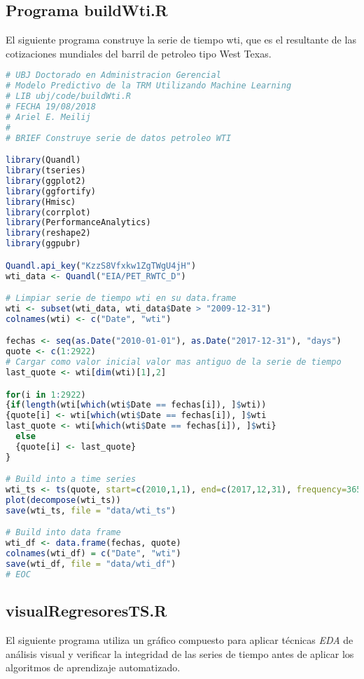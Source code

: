 \subsection{Programa buildWti.R}
El siguiente programa construye la serie de tiempo wti, que es el resultante de las cotizaciones mundiales del barril de petroleo tipo West Texas.
\begin{lstlisting}[language=R]
# UBJ Doctorado en Administracion Gerencial
# Modelo Predictivo de la TRM Utilizando Machine Learning
# LIB ubj/code/buildWti.R
# FECHA 19/08/2018
# Ariel E. Meilij
#
# BRIEF Construye serie de datos petroleo WTI

library(Quandl)
library(tseries)
library(ggplot2)
library(ggfortify)
library(Hmisc)
library(corrplot)
library(PerformanceAnalytics)
library(reshape2)
library(ggpubr)

Quandl.api_key("KzzS8Vfxkw1ZgTWgU4jH")
wti_data <- Quandl("EIA/PET_RWTC_D")

# Limpiar serie de tiempo wti en su data.frame
wti <- subset(wti_data, wti_data$Date > "2009-12-31")
colnames(wti) <- c("Date", "wti")

fechas <- seq(as.Date("2010-01-01"), as.Date("2017-12-31"), "days")
quote <- c(1:2922)
# Cargar como valor inicial valor mas antiguo de la serie de tiempo
last_quote <- wti[dim(wti)[1],2]

for(i in 1:2922)
{if(length(wti[which(wti$Date == fechas[i]), ]$wti))
{quote[i] <- wti[which(wti$Date == fechas[i]), ]$wti
last_quote <- wti[which(wti$Date == fechas[i]), ]$wti}
  else
  {quote[i] <- last_quote}
}

# Build into a time series
wti_ts <- ts(quote, start=c(2010,1,1), end=c(2017,12,31), frequency=365)
plot(decompose(wti_ts))
save(wti_ts, file = "data/wti_ts")

# Build into data frame
wti_df <- data.frame(fechas, quote)
colnames(wti_df) = c("Date", "wti")
save(wti_df, file = "data/wti_df")
# EOC
\end{lstlisting}

\subsection{visualRegresoresTS.R}
El siguiente programa utiliza un gráfico compuesto para aplicar técnicas \emph{EDA} de análisis visual y verificar la integridad de las series de tiempo antes de aplicar los algoritmos de aprendizaje automatizado.

